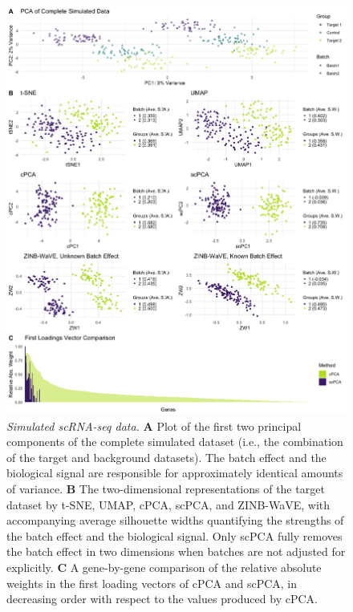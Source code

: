 \begin{figure}[!htbp]
  \centering
  \includegraphics[width = \textwidth]{figures/sim_results}
  \caption{
  {\em Simulated scRNA-seq data.}
  \textbf{A} Plot of the first two principal components of the complete simulated dataset (i.e., the combination of the target and background datasets). The batch effect and the biological signal are responsible for approximately identical amounts of variance. \textbf{B} The two-dimensional representations of the target dataset by t-SNE, UMAP, cPCA, scPCA, and ZINB-WaVE, with accompanying average silhouette widths quantifying the strengths of the batch effect and the biological signal. Only scPCA fully removes the batch effect in two dimensions when batches are not adjusted for explicitly. \textbf{C} A gene-by-gene comparison of the relative absolute weights in the first loading vectors of cPCA and scPCA, in decreasing order with respect to the values produced by cPCA.}
  \label{fig:sim}
\end{figure}

